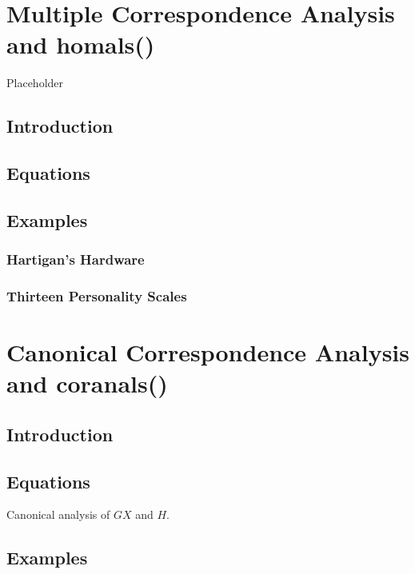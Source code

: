 \documentclass[
  12pt,
]{book}
\begin{document}
\chapter{Multiple Correspondence Analysis and homals()}\label{multiple-correspondence-analysis-and-homals}

Placeholder

\section{Introduction}\label{introduction-1}

\section{Equations}\label{equations}

\section{Examples}\label{examples}

\subsection{Hartigan's Hardware}\label{hartigans-hardware}

\subsection{Thirteen Personality Scales}\label{thirteen-personality-scales}

\chapter{Canonical Correspondence Analysis and coranals()}\label{canonical-correspondence-analysis-and-coranals}

\section{Introduction}\label{introduction-2}

\section{Equations}\label{equations-1}

Canonical analysis of \(GX\) and \(H\).

\section{Examples}\label{examples-1}
\end{document}
